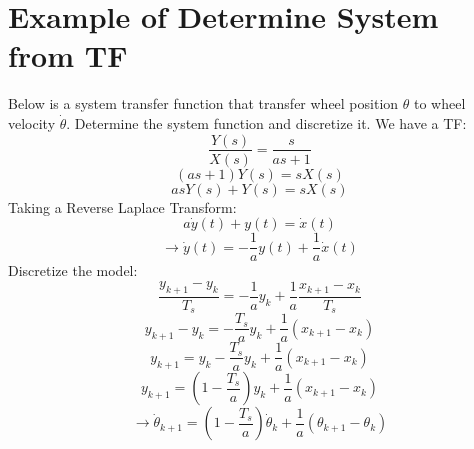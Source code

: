 \documentclass[12pt,a4paper]{article}
\begin{document}
	
	\section{Example of Determine System from TF}
	Below is a system transfer function that transfer wheel position $\theta$ to wheel velocity $\dot{\theta}$. Determine the system function and discretize it.
	We have a TF:
	\[\frac{Y(s)}{X(s)} = \frac{s}{as + 1}\]
	\[(as + 1)Y(s) = sX(s)\]
	\[asY(s) + Y(s) = sX(s)\]
	Taking a Reverse Laplace Transform:
	\[a\dot{y}(t) + y(t) = \dot{x}(t)\]
	\[\rightarrow \boxed{\dot{y}(t) = -\frac{1}{a}y(t) + \frac{1}{a}\dot{x}(t)}\]
	Discretize the model:
	\[\frac{y_{k+1}- y_k}{T_s} = -\frac{1}{a}y_k + \frac{1}{a}\frac{x_{k+1}- x_k}{T_s}\]
	\[y_{k+1}- y_k = -\frac{T_s}{a}y_k + \frac{1}{a}(x_{k+1}- x_k)\]
	\[y_{k+1} = y_k - \frac{T_s}{a}y_k + \frac{1}{a}(x_{k+1}- x_k)\]
	\[y_{k+1} = (1- \frac{T_s}{a})y_k + \frac{1}{a}(x_{k+1}- x_k)\]
	\[\rightarrow \boxed{\dot{\theta}_{k+1} = (1- \frac{T_s}{a})\dot{\theta}_k + \frac{1}{a}(\theta_{k+1}- \theta_k)}\]
	
	
	
\end{document}
